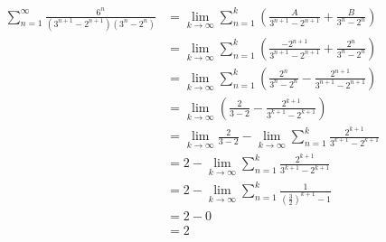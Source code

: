 \begin{align*}
\sum_{n = 1}^{\infty} \frac{6^n}{(3^{n+1} - 2^{n+1})(3^n - 2^n)}
&= \lim_{k \rightarrow \infty} \sum_{n = 1}^{k} \left( \frac{A}{3^{n+1} - 2^{n+1}} + \frac{B}{3^n - 2^n} \right) \\
&= \lim_{k \rightarrow \infty} \sum_{n = 1}^{k} \left( \frac{-2^{n+1}}{3^{n+1} - 2^{n+1}} + \frac{2^n}{3^n - 2^n} \right) \\
&= \lim_{k \rightarrow \infty} \sum_{n = 1}^{k} \left( \frac{2^n}{3^n - 2^n} - \frac{2^{n+1}}{3^{n+1} - 2^{n+1}} \right) \\
&= \lim_{k \rightarrow \infty} \left( \frac{2}{3 - 2} - \frac{2^{k+1}}{3^{k+1} - 2^{k+1}} \right) \\
&= \lim_{k \rightarrow \infty} \frac{2}{3-2} - \lim_{k \rightarrow \infty} \sum_{n = 1}^{k} \frac{2^{k+1}}{3^{k+1} - 2^{k+1}} \\
&= 2 - \lim_{k \rightarrow \infty} \sum_{n = 1}^{k} \frac{2^{k+1}}{3^{k+1} - 2^{k+1}} \\
&= 2 - \lim_{k \rightarrow \infty} \sum_{n = 1}^{k} \frac{1}{(\frac{3}{2})^{k+1} - 1} \\
&= 2 - 0 \\
&= \boxed{2}
\end{align*}
